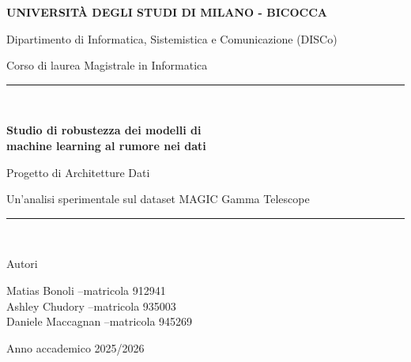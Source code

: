 \documentclass[12pt,a4paper]{article}
\begin{document}
\begin{titlepage}
	\centering
	\vspace*{0.6cm}
	{\Large\bfseries UNIVERSIT\`A DEGLI STUDI DI MILANO - BICOCCA\par}
	\vspace{0.4cm}
	{\large Dipartimento di Informatica, Sistemistica e Comunicazione (DISCo)\par}
	\vspace{0.2cm}
	{\large Corso di laurea Magistrale in Informatica\par}
	\vspace{1.2cm}

	\rule{\textwidth}{0.4pt}\\[0.4cm]
	{\LARGE\bfseries Studio di robustezza dei modelli di\\ machine learning al
	rumore nei dati\par}
	\vspace{0.35cm}
	{\large Progetto di Architetture Dati\par}
	\vspace{0.25cm}
	{\normalsize Un'analisi sperimentale sul dataset MAGIC Gamma Telescope\par}
	\rule{\textwidth}{0.4pt}\\[1.4cm]

	\begin{minipage}{0.9\textwidth}
		\centering
		{\large Autori\par}
		\vspace{0.3cm}
		{\large
			Matias Bonoli \quad--\quad matricola 912941\\[0.25cm]
			Ashley Chudory \quad--\quad matricola 935003\\[0.25cm]
			Daniele Maccagnan \quad--\quad matricola 945269\\
		}
	\end{minipage}

	\vfill
	{\large Anno accademico 2025/2026\par}
\end{titlepage}

\tableofcontents
\thispagestyle{plain}
\clearpage

\end{document}
